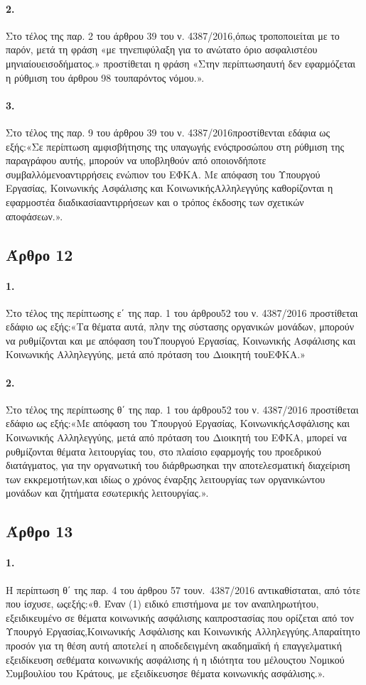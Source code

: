 \documentclass[a4paper,oneside, 10pt]{book}
\begin{document}
\paragraph { 2. } Στο τέλος της παρ. 2 του άρθρου 39 του ν. 4387/2016,όπως τροποποιείται με το παρόν, μετά τη φράση «με τηνεπιφύλαξη για το ανώτατο όριο ασφαλιστέου μηνιαίουεισοδήματος.» προστίθεται η φράση «Στην περίπτωσηαυτή δεν εφαρμόζεται η ρύθμιση του άρθρου 98 τουπαρόντος νόμου.».
\paragraph { 3. } Στο τέλος της παρ. 9 του άρθρου 39 του ν. 4387/2016προστίθενται εδάφια ως εξής:«Σε περίπτωση αμφισβήτησης της υπαγωγής ενόςπροσώπου στη ρύθμιση της παραγράφου αυτής, μπορούν να υποβληθούν από οποιονδήποτε συμβαλλόμενοαντιρρήσεις ενώπιον του ΕΦΚΑ. Με απόφαση του Υπουργού Εργασίας, Κοινωνικής Ασφάλισης και ΚοινωνικήςΑλληλεγγύης καθορίζονται η εφαρμοστέα διαδικασίααντιρρήσεων και ο τρόπος έκδοσης των σχετικών αποφάσεων.».
\subsection*{ Άρθρο 12 }
\paragraph { 1. } Στο τέλος της περίπτωσης ε΄ της παρ. 1 του άρθρου52 του ν. 4387/2016 προστίθεται εδάφιο ως εξής:«Τα θέματα αυτά, πλην της σύστασης οργανικών μονάδων, μπορούν να ρυθμίζονται και με απόφαση τουΥπουργού Εργασίας, Κοινωνικής Ασφάλισης και Κοινωνικής Αλληλεγγύης, μετά από πρόταση του Διοικητή τουΕΦΚΑ.»
\paragraph { 2. } Στο τέλος της περίπτωσης θ΄ της παρ. 1 του άρθρου52 του ν. 4387/2016 προστίθεται εδάφιο ως εξής:«Με απόφαση του Υπουργού Εργασίας, ΚοινωνικήςΑσφάλισης και Κοινωνικής Αλληλεγγύης, μετά από πρόταση του Διοικητή του ΕΦΚΑ, μπορεί να ρυθμίζονται θέματα λειτουργίας του, στο πλαίσιο εφαρμογής του προεδρικού διατάγματος, για την οργανωτική του διάρθρωσηκαι την αποτελεσματική διαχείριση των εκκρεμοτήτων,και ιδίως ο χρόνος έναρξης λειτουργίας των οργανικώντου μονάδων και ζητήματα εσωτερικής λειτουργίας.».
\subsection*{ Άρθρο 13 }
\paragraph { 1. } Η περίπτωση θ΄ της παρ. 4 του άρθρου 57 τουν. 4387/2016 αντικαθίσταται, από τότε που ίσχυσε, ωςεξής:«θ. Έναν (1) ειδικό επιστήμονα με τον αναπληρωτήτου, εξειδικευμένο σε θέματα κοινωνικής ασφάλισης καιπροστασίας που ορίζεται από τον Υπουργό Εργασίας,Κοινωνικής Ασφάλισης και Κοινωνικής Αλληλεγγύης.Απαραίτητο προσόν για τη θέση αυτή αποτελεί η αποδεδειγμένη ακαδημαϊκή ή επαγγελματική εξειδίκευση σεθέματα κοινωνικής ασφάλισης ή η ιδιότητα του μέλουςτου Νομικού Συμβουλίου του Κράτους, με εξειδίκευσησε θέματα κοινωνικής ασφάλισης.».
\end{document}
